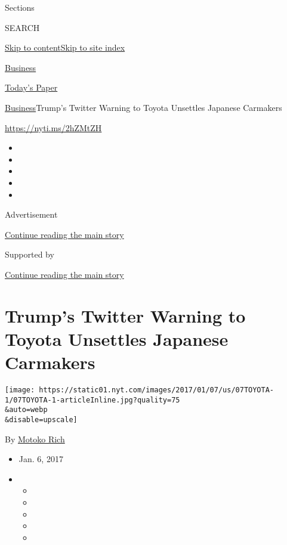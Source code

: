 Sections

SEARCH

\protect\hyperlink{site-content}{Skip to
content}\protect\hyperlink{site-index}{Skip to site index}

\href{https://www.nytimes.com/section/business}{Business}

\href{https://myaccount.nytimes.com/auth/login?response_type=cookie\&client_id=vi}{}

\href{https://www.nytimes.com/section/todayspaper}{Today's Paper}

\href{/section/business}{Business}\textbar{}Trump's Twitter Warning to
Toyota Unsettles Japanese Carmakers

\url{https://nyti.ms/2hZMtZH}

\begin{itemize}
\item
\item
\item
\item
\item
\end{itemize}

Advertisement

\protect\hyperlink{after-top}{Continue reading the main story}

Supported by

\protect\hyperlink{after-sponsor}{Continue reading the main story}

\hypertarget{trumps-twitter-warning-to-toyota-unsettles-japanese-carmakers}{%
\section{Trump's Twitter Warning to Toyota Unsettles Japanese
Carmakers}\label{trumps-twitter-warning-to-toyota-unsettles-japanese-carmakers}}

\texttt{[image: https://static01.nyt.com/images/2017/01/07/us/07TOYOTA-1/07TOYOTA-1-articleInline.jpg?quality=75\\\&auto=webp\\\&disable=upscale]}

By \href{http://www.nytimes.com/by/motoko-rich}{Motoko Rich}

\begin{itemize}
\item
  Jan. 6, 2017
\item
  \begin{itemize}
  \item
  \item
  \item
  \item
  \item
  \end{itemize}
\end{itemize}


